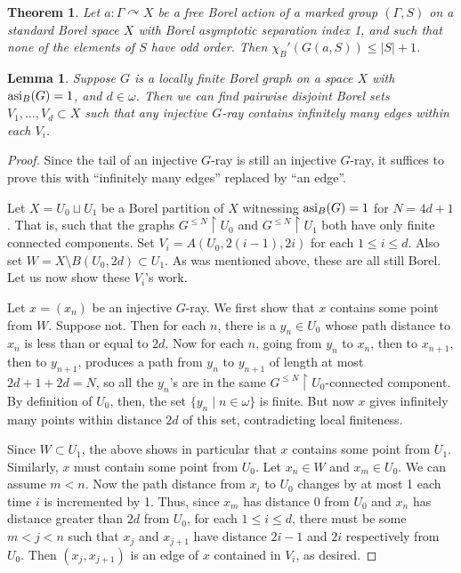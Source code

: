 \documentclass[10pt,a4paper]{article}
\newcommand{\0}{\varnothing}
\newcommand{\asi}{\textnormal{asi}}
\newcommand{\res}{\upharpoonright}
\newtheorem{theorem}{Theorem}
\newtheorem{lemma}{Lemma}
\begin{document}
\begin{theorem}\label{th:d+1}
Let $a:\Gamma \curvearrowright X$ be a free Borel action of a marked group $(\Gamma,S)$ on a standard Borel space $X$ with Borel asymptotic separation index 1, and such that none of the elements of $S$ have odd order. Then $\chi_{B}'(G(a,S)) \leq |S|+1$.
\end{theorem}

\begin{lemma}\label{lem:rainbow}
Suppose $G$ is a locally finite Borel graph on a space $X$ with $\asi_B(G) = 1$, and $d \in \omega$. Then we can find pairwise disjoint Borel sets $V_1,\ldots,V_d \subset X$ such that any injective $G$-ray contains infinitely many edges within each $V_i$.
\end{lemma}

\begin{proof}
Since the tail of an injective $G$-ray is still an injective $G$-ray, it suffices to prove this with ``infinitely many edges'' replaced by ``an edge''. 

Let $X = U_0 \sqcup U_1$ be a Borel partition of $X$ witnessing $\asi_B(G) = 1$ for $N = 4d+1$. That is, such that the graphs $G^{\leq N} \res U_0$ and $G^{\leq N} \res U_1$ both have only finite connected components. Set $V_i = A(U_0,2(i-1),2i)$ for each $1 \leq i \leq d$. Also set $W = X \setminus B(U_0,2d) \subset U_1$. As was mentioned above, these are all still Borel. Let us now show these $V_i$'s work.

Let $x = (x_n)$ be an injective $G$-ray. We first show that $x$ contains some point from $W$. Suppose not. Then for each $n$, there is a $y_n \in U_0$ whose path distance to $x_n$ is less than or equal to $2d$. Now for each $n$, going from $y_n$ to $x_n$, then to $x_{n+1}$, then to $y_{n+1}$, produces a path from $y_n$ to $y_{n+1}$ of length at most $2d+1+2d=N$, so all the $y_n$'s are in the same $G^{\leq N} \res U_0$-connected component. By definition of $U_0$, then, the set $\{y_n \mid n \in \omega\}$ is finite. But now $x$ gives infinitely many points within distance $2d$ of this set, contradicting local finiteness.

Since $W \subset U_1$, the above shows in particular that $x$ contains some point from $U_1$. Similarly, $x$ must contain some point from $U_0$. Let $x_n \in W$ and $x_m \in U_0$. We can assume $m < n$. Now the path distance from $x_i$ to $U_0$ changes by at most 1 each time $i$ is incremented by 1. Thus, since $x_m$ has distance 0 from $U_0$ and $x_n$ has distance greater than $2d$ from $U_0$, for each $1 \leq i \leq d$, there must be some $m < j < n$ such that $x_{j}$ and $x_{j+1}$ have distance $2i-1$ and $2i$ respectively from $U_0$. Then $(x_j,x_{j+1})$ is an edge of $x$ contained in $V_i$, as desired.

\end{proof}
\end{document}

